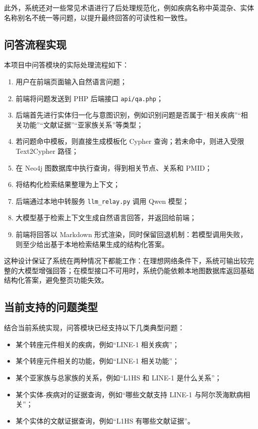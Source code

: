 此外，系统还对一些常见术语进行了后处理规范化，例如疾病名称中英混杂、实体名称别名不统一等问题，以提升最终回答的可读性和一致性。

\subsection{问答流程实现}

本项目中问答模块的实际处理流程如下：

\begin{enumerate}[leftmargin=2em]
  \item 用户在前端页面输入自然语言问题；
  \item 前端将问题发送到 PHP 后端接口 \texttt{api/qa.php}；
  \item 后端首先进行实体归一化与意图识别，例如识别问题是否属于“相关疾病”“相关功能”“文献证据”“亚家族关系”等类型；
  \item 若问题命中模板，则直接生成模板化 Cypher 查询；若未命中，则进入受限 Text2Cypher 路径；
  \item 在 Neo4j 图数据库中执行查询，得到相关节点、关系和 PMID；
  \item 将结构化检索结果整理为上下文；
  \item 后端通过本地中转服务 \texttt{llm\_relay.py} 调用 Qwen 模型；
  \item 大模型基于检索上下文生成自然语言回答，并返回给前端；
  \item 前端将回答以 Markdown 形式渲染，同时保留回退机制：若模型调用失败，则至少给出基于本地检索结果生成的结构化答案。
\end{enumerate}

这种设计保证了系统在两种情况下都能工作：在理想网络条件下，系统可输出较完整的大模型增强回答；在模型接口不可用时，系统仍能依赖本地图数据库返回基础结构化答案，避免整页功能失效。

\subsection{当前支持的问题类型}

结合当前系统实现，问答模块已经支持以下几类典型问题：

\begin{itemize}[leftmargin=2em]
  \item 某个转座元件相关的疾病，例如“LINE-1 相关疾病”；
  \item 某个转座元件相关的功能，例如“LINE-1 相关功能”；
  \item 某个亚家族与总家族的关系，例如“L1HS 和 LINE-1 是什么关系”；
  \item 某个实体-疾病对的证据查询，例如“哪些文献支持 LINE-1 与阿尔茨海默病相关”；
  \item 某个实体的文献证据查询，例如“L1HS 有哪些文献证据”。
\end{itemize}

